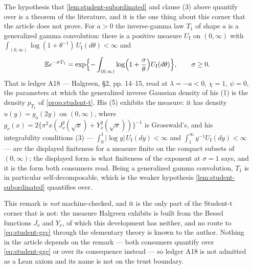 \begin{remark}
\label{rem:student-ggc}
The hypothesis that \ref{lem:student-subordinated} and clause (3) above quantify over is a
theorem of the literature, and it is the one thing about this corner that the article does not
prove. For $a > 0$ the inverse-gamma law $T_1$ of shape $a$ is a generalized gamma convolution:
there is a positive measure $U_{\mathrm I}$ on $(0,\infty)$ with
$\int_{(0,\infty)}\log(1 + \theta^{-1})\,U_{\mathrm I}(d\theta) < \infty$ and
\begin{equation}\label{eq:student-ggc}
  \mathbb{E}e^{-\sigma T_1}
   = \exp\Bigl\{-\int_{(0,\infty)}\log\Bigl(1 + \frac{\sigma}{\theta}\Bigr)
       U_{\mathrm I}(d\theta)\Bigr\}, \qquad \sigma \ge 0 .
\end{equation}
That is ledger A18 --- Halgreen, \S2, pp. 14--15, read at $\lambda = -a < 0$, $\chi = 1$,
$\psi = 0$, the parameters at which the generalized inverse Gaussian density of his (1) is the
density $p_{T_1}$ of \ref{prop:student-t}. His (5) exhibits the measure: it has density
$u(y) = g_a(2y)$ on $(0,\infty)$, where
$g_\nu(x) = 2\{\pi^2x(J_\nu^2(\sqrt x) + Y_\nu^2(\sqrt x))\}^{-1}$ is Grosswald's, and his
integrability conditions (3) --- $\int_0^1|\log y|\,U_{\mathrm I}(dy) < \infty$ and
$\int_1^\infty y^{-1}U_{\mathrm I}(dy) < \infty$ --- are the displayed finiteness for a measure
finite on the compact subsets of $(0,\infty)$; the displayed form is what finiteness of the
exponent at $\sigma = 1$ says, and it is the form both consumers read. Being a generalized gamma
convolution, $T_1$ is in particular self-decomposable, which is the weaker hypothesis
\ref{lem:student-subordinated} quantifies over.

This remark is \emph{not} machine-checked, and it is the only part of the Student-t corner that
is not: the measure Halgreen exhibits is built from the Bessel functions $J_\nu$ and $Y_\nu$,
of which this development has neither, and no route to \ref{eq:student-ggc} through the
elementary theory is known to the author. Nothing in the article depends on the remark ---
both consumers quantify over \ref{eq:student-ggc} or over its consequence instead --- so ledger
A18 is not admitted as a Lean axiom and its name is not on the trust boundary.
\end{remark}

